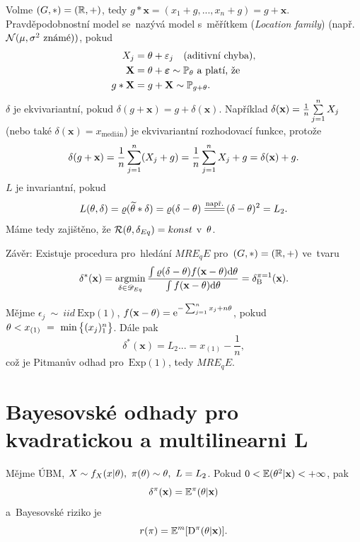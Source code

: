 \begin{example}
	Volme $(G,\ast)=(\mathbb{R},+)$, tedy $g\ast\textbf{x}=(x_1+g,...,x_n+g)=g+\textbf{x}$. Pravděpodobnostní model se~nazývá model s~měřítkem (\textit{Location family}) (např. $\mathcal{N}(\mu,\sigma^2 \text{ známé}))$, pokud
	\[
	\begin{split}
	X_j&=\theta+\varepsilon_j\quad(\text{aditivní chyba}),\\
	\textbf{X}&=\theta+\boldsymbol{\varepsilon}\sim\mathbb{P}_\theta\text{ a~platí, že }\\
	g\ast \textbf{X}&=g+\textbf{X}\sim \mathbb{P}_{g+\theta}.
	\end{split}
	\]
	$\delta$ je ekvivariantní, pokud $\delta(g+\textbf{x})=g+\delta(\textbf{x})$. Například $\delta(\textbf{x})=\frac{1}{n}\sum\limits_{j=1}^{n} X_j$ (nebo také $\delta(\textbf{x})=x_{\text{medián}}$) je ekvivariantní rozhodovací funkce, protože $$\delta(g+\textbf{x})=\frac{1}{n}\sum\limits_{j=1}^{n} (X_j+g)=\frac{1}{n}\sum\limits_{j=1}^{n} X_j + g=\delta(\textbf{x})+g.$$ $L$ je invariantní, pokud $$L(\t,\delta)=\rho(\widetilde{\t}\ast\delta)=\rho(\delta-\t)\equal{\text{např.}}(\delta-\t)^2=L_2.$$ Máme tedy zajištěno, že $\mathcal{R}(\theta,\delta_{Eq})=konst$ v~$\theta$.
	
	Závěr: Existuje procedura pro~hledání $MRE_qE$ pro~$(G,\ast)=(\mathbb{R},+)$ ve~tvaru
	$$ \delta^\ast(\textbf{x})=\mathop{\mathrm{argmin}}_{\delta\in\mathscr{D} _{Eq}}\frac{\int\varrho(\delta-\theta)f(\textbf{x}-\theta)\mathrm{d}\theta}{\int f(\textbf{x}-\theta)\mathrm{d}\theta}=\delta_\mathrm{B}^{\pi=1}(\textbf{x}).$$
\end{example}
\begin{example}
	Mějme $\epsilon_j~\sim~iid~\mathrm{Exp}(1)$, $f(\textbf{x}-\theta)=\mathrm{e}^{-\sum_{j=1}^n x_j+n\theta}$, pokud $\theta< x_{(1)}~=~\min\big\{ (x_j)_1^n\big\}$. Dále pak
	$$ \delta^\ast(\textbf{x})\equal{L_2}...=x_{(1)}-\frac{1}{n},$$ což je Pitmanův odhad pro~$\mathrm{Exp}(1)$, tedy $MRE_qE$.
\end{example}

\chapter{Bayesovské odhady pro kvadratickou a multilinearni L}

\begin{remark}\label{veta1}
	Mějme ÚBM, $X\sim f_{X}(x|\theta),~\pi(\theta)\sim \theta,~L=L_2$. Pokud $0<\mathbb{E}(\theta^2|\textbf{x})<+\infty$, pak $$\delta^\pi(\textbf{x})=\mathbb{E}^\pi(\theta|\textbf{x})$$ a~Bayesovské riziko  je $$r(\pi)=\mathbb{E}^m[\mathrm{D}^\pi(\theta|\textbf{x})].$$
\end{remark}

